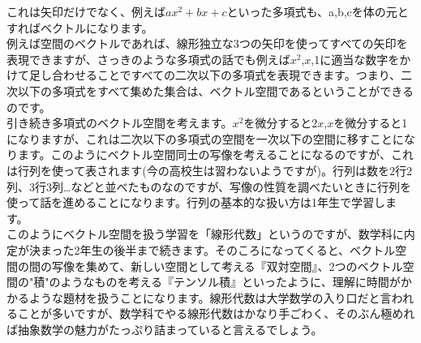 これは矢印だけでなく、例えば$ax^2 + bx + c$といった多項式も、a,b,cを体の元とすればベクトルになります。\\
例えば空間のベクトルであれば、線形独立な3つの矢印を使ってすべての矢印を表現できますが、さっきのような多項式の話でも例えば$x ^ 2$,$x$,1に適当な数字をかけて足し合わせることですべての二次以下の多項式を表現できます。つまり、二次以下の多項式をすべて集めた集合は、ベクトル空間であるということができるのです。\\
引き続き多項式のベクトル空間を考えます。$x^2$を微分すると$2x$,$x$を微分すると1になりますが、これは二次以下の多項式の空間を一次以下の空間に移すことになります。このようにベクトル空間同士の写像を考えることになるのですが、これは行列を使って表されます(今の高校生は習わないようですが)。行列は数を2行2列、3行3列…などと並べたものなのですが、写像の性質を調べたいときに行列を使って話を進めることになります。行列の基本的な扱い方は1年生で学習します。\\
このようにベクトル空間を扱う学習を「線形代数」というのですが、数学科に内定が決まった2年生の後半まで続きます。そのころになってくると、ベクトル空間の間の写像を集めて、新しい空間として考える『双対空間』、2つのベクトル空間の"積"のようなものを考える『テンソル積』といったように、理解に時間がかかるような題材を扱うことになります。線形代数は大学数学の入り口だと言われることが多いですが、数学科でやる線形代数はかなり手ごわく、そのぶん極めれば抽象数学の魅力がたっぷり詰まっていると言えるでしょう。